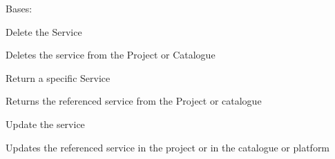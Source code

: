 \documentclass[letterpaper,10pt,english]{sphinxmanual}
\begin{document}

\begin{fulllineitems}
\label{_source/son_editor.apis:son_editor.apis.project_servicesapi.Service}
Bases: 

\begin{fulllineitems}
\label{_source/son_editor.apis:son_editor.apis.project_servicesapi.Service.delete}
Delete the Service

Deletes the service from the Project or Catalogue

\end{fulllineitems}


\begin{fulllineitems}
\label{_source/son_editor.apis:son_editor.apis.project_servicesapi.Service.get}
Return a specific Service

Returns the referenced service from the Project or catalogue

\end{fulllineitems}


\begin{fulllineitems}
\label{_source/son_editor.apis:son_editor.apis.project_servicesapi.Service.methods}
\end{fulllineitems}


\begin{fulllineitems}
\label{_source/son_editor.apis:son_editor.apis.project_servicesapi.Service.put}
Update the service

Updates the referenced service in the project or in the catalogue or platform

\end{fulllineitems}


\end{fulllineitems}
\end{document}
